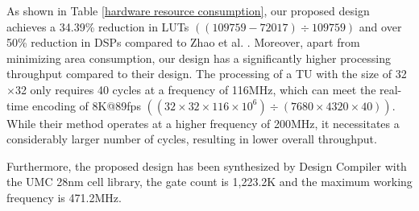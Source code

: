 \documentclass[lettersize,journal]{IEEEtran}
\begin{document}
As shown in Table \ref{hardware resource consumption}, our proposed design achieves a 34.39\% reduction in LUTs $((109759 - 72017) \div 109759)$ and over 50\% reduction in DSPs compared to Zhao et al. \cite{zhao2023scanline}. 
Moreover, apart from minimizing area consumption, our design has a significantly higher processing throughput compared to their design.
The processing of a TU with the size of 32$\times$32 only requires 40 cycles at a frequency of 116MHz, which can meet the real-time encoding of 8K@89fps $((32\times32\times116\times10^6) \div (7680\times4320\times40))$. 
While their method operates at a higher frequency of 200MHz, it necessitates a considerably larger number of cycles, resulting in lower overall throughput. 

Furthermore, the proposed design has been synthesized by Design Compiler with the UMC 28nm cell library, the gate count is 1,223.2K and the maximum working frequency is 471.2MHz. 
\end{document}
